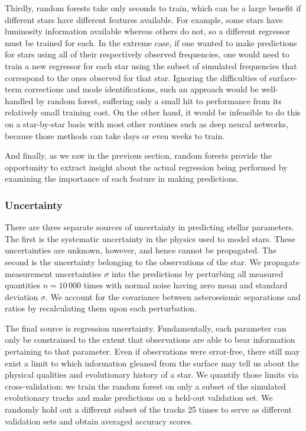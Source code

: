 \documentclass[twocolumn,twocolappendix]{aastex6}
\newif\ifref
\newcommand{\mb}[1]{\ifref\boldmath\textbf{#1}\unboldmath\else #1\fi}
\begin{document}
Thirdly, random forests take only seconds to train, which can be a large benefit if different stars have different \mb{features} available. For example, some stars have luminosity information available whereas others do not, so a different regressor must be trained for each. In the extreme case, if one wanted to make predictions for stars using all of their respectively observed frequencies, one would need to train a new regressor for each star using the subset of simulated frequencies that correspond to the ones observed for that star. Ignoring the difficulties of surface-term corrections and mode identifications, such an approach would be well-handled by random forest, suffering only a small hit to performance from its relatively small training cost. On the other hand, it would be infeasible to do this on a star-by-star basis with most other routines such as deep neural networks, because \mb{those} methods can take days or even weeks to train. 

And finally\mb{, as we saw in the previous section,} random forests provide the opportunity to extract insight about the actual regression being performed by examining the importance of each \mb{feature} in making predictions. 


\subsubsection{Uncertainty}
\label{sec:uncertainties}
There are three separate sources of uncertainty in predicting stellar parameters. The first is the systematic uncertainty in the physics used to model stars. These uncertainties are unknown, however, and hence cannot be propagated. The second is the uncertainty belonging to the observations of the star. We propagate measurement uncertainties $\sigma$ into the predictions by perturbing all measured quantities $n=10\,000$ times with normal noise having zero mean and standard deviation $\sigma$. We account for the covariance between asteroseismic separations and ratios by recalculating them upon each perturbation. 

The final source is regression uncertainty. Fundamentally, each parameter can only be constrained to the extent that observations are able to bear information pertaining to that parameter. Even if observations were error-free, there still may exist a limit to which information gleaned from the surface may tell us about the physical \mb{qualities} and evolutionary history of a star. We quantify those limits via cross-validation: we train the random forest on only a subset of the simulated evolutionary tracks and make predictions on a held-out validation set. We randomly hold out a different subset of the tracks 25 times to serve as different validation sets and obtain averaged accuracy scores.
\end{document}
